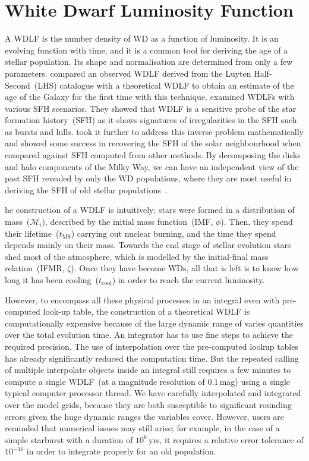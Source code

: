 \documentclass[fleqn,usenatbib]{rasti}
\begin{document}
\section{White Dwarf Luminosity Function}
A WDLF is the number density of WD as a function of luminosity.
It is an evolving function with time, and it is a common tool for deriving the
age of a stellar population. Its shape and normalisation are determined
from only a few parameters. \citet{1987ApJ...315L..77W} compared an observed 
WDLF derived from the Luyten Half-Second~(LHS) catalogue with a theoretical
WDLF to obtain an estimate of the age of the Galaxy for the first time with
this technique. \citet{1990ApJ...352..605N} examined WDLFs with various SFH
scenarios. They showed that WDLF is a sensitive probe of the star formation
history~(SFH) as it shows signatures of irregularities in the SFH such as bursts
and lulls. \citet{2013MNRAS.434.1549R} took it further to address this inverse
problem mathematically and showed some success in recovering the SFH of the
solar neighbourhood when compared against SFH computed from other methods. By
decomposing the disks and halo components of the Milky Way, we can have an
independent view of the past SFH revealed by only the WD populations, where
they are most useful in deriving the SFH of old stellar
populations~\citep{2011MNRAS.417...93R, 2017ASPC..509...25L}.


he construction of a WDLF is intuitively: stars were formed in
a distribution of mass~($\mathcal{M}_i$), described by the initial mass
function~(IMF, $\phi$). Then, they spend their 
lifetime~($t_{\mathrm{MS}}$) carrying out nuclear burning, and the time they
spend depends mainly on their mass. Towards the end stage of stellar evolution
stars shed most of the atmosphere, which is modelled by the initial-final mass
relation~(IFMR, $\zeta$). Once they have become WDs, all that is left is to
know how long it has been cooling~($t_{\mathrm{cool}}$) in order to reach the
current luminosity. 

However, to encompass all these physical
processes in an integral even with pre-computed look-up table, the construction
of a theoretical WDLF is computationally expensive because of the large dynamic
range of varies quantities over the total evolution time. An integrator has to
use fine steps to achieve the required precision. The use of interpolation over
the pre-computed lookup tables has already significantly reduced the computation
time. But the repeated calling of multiple interpolate objects inside an
integral still requires a few minutes to compute a single WDLF~(at a magnitude
resolution of $0.1$\,mag) using a single typical computer processor thread.
We have carefully interpolated and integrated over the model grids, because
they are both susceptible to significant rounding errors given
the huge dynamic ranges the variables cover. However, users are reminded 
that numerical issues may still arise; for example, in the case of a
simple starburst with a duration of $10^6$\,yrs, it requires a
relative error tolerance of $10^{-10}$ in order to integrate properly for an
old population. 
\end{document}

